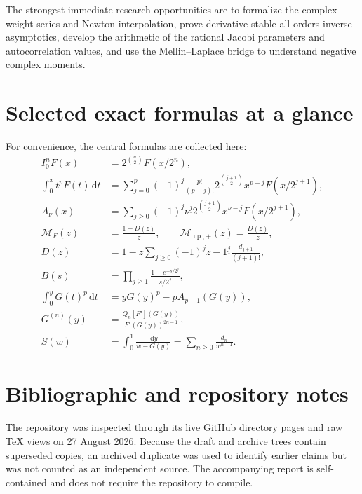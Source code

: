 \documentclass[11pt,oneside]{article}
\theoremstyle{definition}
\theoremstyle{remark}
\newcommand{\dd}{\,\mathrm d}
\newcommand{\upf}{\operatorname{up}}
\newcommand{\falling}[2]{#1^{\underline{#2}}}
\begin{document}
The strongest immediate research opportunities are to formalize the complex-weight series and Newton interpolation, prove derivative-stable all-orders inverse asymptotics, develop the arithmetic of the rational Jacobi parameters and autocorrelation values, and use the Mellin--Laplace bridge to understand negative complex moments.

\appendix

\section{Selected exact formulas at a glance}

For convenience, the central formulas are collected here:
\begin{align*}
 I_0^nF(x)&=2^{\binom n2}F(x/2^n),\\
 \int_0^xt^pF(t)\dd t
 &=\sum_{j=0}^{p}(-1)^j\frac{p!}{(p-j)!}
 2^{\binom{j+1}{2}}x^{p-j}F(x/2^{j+1}),\\
 A_\nu(x)
 &=\sum_{j\ge0}(-1)^j\falling{\nu}{j}
 2^{\binom{j+1}{2}}x^{\nu-j}F(x/2^{j+1}),\\
 \mathcal M_F(z)&=\frac{1-D(z)}z,
 \qquad \mathcal M_{\upf,+}(z)=\frac{D(z)}z,\\
 D(z)&=1-z\sum_{j\ge0}(-1)^j\falling{z-1}{j}
 \frac{d_{j+1}}{(j+1)!},\\
 B(s)&=\prod_{j\ge1}\frac{1-e^{-s/2^j}}{s/2^j},\\
 \int_0^yG(t)^p\dd t&=yG(y)^p-pA_{p-1}(G(y)),\\
 G^{(n)}(y)&=\frac{Q_n[F'](G(y))}{F'(G(y))^{2n-1}},\\
 S(w)&=\int_0^1\frac{\dd y}{w-G(y)}
 =\sum_{n\ge0}\frac{d_n}{w^{n+1}}.
\end{align*}

\section{Bibliographic and repository notes}

The repository was inspected through its live GitHub directory pages and raw TeX views on 27 August 2026.  Because the draft and archive trees contain superseded copies, an archived duplicate was used to identify earlier claims but was not counted as an independent source.  The accompanying report is self-contained and does not require the repository to compile.
\end{document}
